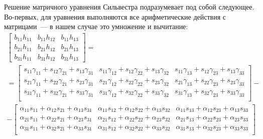 \documentclass[12pt,a4paper,openany]{extarticle}
\begin{document}
Решение матричного уравнения Сильвестра подразумевает под собой следующее.
Во-первых, для уравнения выполняются все арифметические действия с матрицами~--- в нашем случае это умножение и вычитание:
\begin{multline*}
	\begin{bmatrix}
		b_{11}h_{11} & b_{11}h_{12} & b_{11}h_{13} \\
		b_{21}h_{11} & b_{21}h_{12} & b_{21}h_{13} \\
		b_{31}h_{11} & b_{31}h_{12} & b_{31}h_{13}	
	\end{bmatrix}
	= \\ =
	\begin{bmatrix}
		s_{11}\gamma_{11}+s_{12}\gamma_{21}+s_{13}\gamma_{31} & s_{11}\gamma_{12}+s_{12}\gamma_{22}+s_{13}\gamma_{32} & 
		s_{11}\gamma_{13}+s_{12}\gamma_{23}+s_{13}\gamma_{33}\\
		s_{21}\gamma_{11}+s_{22}\gamma_{21}+s_{23}\gamma_{31} & s_{21}\gamma_{12}+s_{22}\gamma_{22}+s_{23}\gamma_{32} & 
		s_{21}\gamma_{13}+s_{22}\gamma_{23}+s_{23}\gamma_{33}\\
		s_{31}\gamma_{11}+s_{32}\gamma_{21}+s_{33}\gamma_{31} & s_{31}\gamma_{12}+s_{32}\gamma_{22}+s_{33}\gamma_{32} & 
		s_{31}\gamma_{13}+s_{32}\gamma_{23}+s_{33}\gamma_{33}\\
	\end{bmatrix}
	- \\ -
	\begin{bmatrix}
		\alpha_{11}s_{11}+\alpha_{12}s_{21}+\alpha_{13}s_{31} & \alpha_{11}s_{12}+\alpha_{12}s_{22}+\alpha_{13}s_{32} & 
		\alpha_{11}s_{13}+\alpha_{12}s_{23}+\alpha_{13}s_{33}\\
		\alpha_{21}s_{11}+\alpha_{22}s_{21}+\alpha_{23}s_{31} & \alpha_{21}s_{12}+\alpha_{22}s_{22}+\alpha_{23}s_{32} & 
		\alpha_{21}s_{13}+\alpha_{22}s_{23}+\alpha_{23}s_{33}\\
		\alpha_{31}s_{11}+\alpha_{32}s_{21}+\alpha_{33}s_{31} & \alpha_{31}s_{12}+\alpha_{32}s_{22}+\alpha_{33}s_{32} & 
		\alpha_{31}s_{13}+\alpha_{32}s_{23}+\alpha_{33}s_{33}\\
	\end{bmatrix}
\end{multline*}
\end{document}
